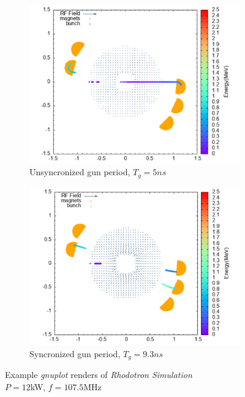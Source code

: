 \documentclass[a4paper,oneside,12pt]{report}
\numberwithin{equation}{chapter}
\begin{document}
\begin{figure}[H]
    \captionsetup[subfigure]{justification=centering}
    \captionsetup{justification=centering}
    \centering
    \begin{subfigure}{0.9\textwidth}
        \centering
        \includegraphics[width=\linewidth]{./figures/rhodoSim/5ns_gnuplot.png}
        \caption*{Unsyncronized \e gun period, $T_g = 5ns$}
    \end{subfigure}
    \begin{subfigure}{0.9\textwidth}
        \centering
        \includegraphics[width=\linewidth]{./figures/rhodoSim/9_3ns_gnuplot.png}
        \caption*{Syncronized \e gun period, $T_g = 9.3ns$}
    \end{subfigure}
    \caption{Example \textit{gnuplot} renders of \textit{Rhodotron Simulation}\\$P=12$kW, $f=107.5$MHz}
    \label{fig:example_gnuplot_renders}
\end{figure}
\end{document}
